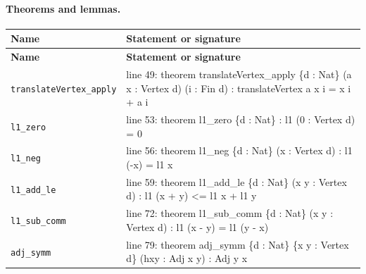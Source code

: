 \documentclass[10pt]{article}
\begin{document}
\paragraph{Theorems and lemmas.}
\begin{longtable}{>{\raggedright\arraybackslash}p{} >{\raggedright\arraybackslash}p{}}
\textbf{Name} & \textbf{Statement or signature} \\
\hline
\endfirsthead
\textbf{Name} & \textbf{Statement or signature} \\
\hline
\endhead
\texttt{translateVertex\_\allowbreak{}apply} & {\ttfamily\scriptsize line 49:\allowbreak{} theorem translateVertex\_\allowbreak{}apply \{d :\allowbreak{} Nat\} (\allowbreak{}a x :\allowbreak{} Vertex d)\allowbreak{} (\allowbreak{}i :\allowbreak{} Fin d)\allowbreak{} :\allowbreak{} translateVertex a x i =\allowbreak{} x i +\allowbreak{} a i} \\[0.45em]
\texttt{l1\_\allowbreak{}zero} & {\ttfamily\scriptsize line 53:\allowbreak{} theorem l1\_\allowbreak{}zero \{d :\allowbreak{} Nat\} :\allowbreak{} l1 (\allowbreak{}0 :\allowbreak{} Vertex d)\allowbreak{} =\allowbreak{} 0} \\[0.45em]
\texttt{l1\_\allowbreak{}neg} & {\ttfamily\scriptsize line 56:\allowbreak{} theorem l1\_\allowbreak{}neg \{d :\allowbreak{} Nat\} (\allowbreak{}x :\allowbreak{} Vertex d)\allowbreak{} :\allowbreak{} l1 (\allowbreak{}-\allowbreak{}x)\allowbreak{} =\allowbreak{} l1 x} \\[0.45em]
\texttt{l1\_\allowbreak{}add\_\allowbreak{}le} & {\ttfamily\scriptsize line 59:\allowbreak{} theorem l1\_\allowbreak{}add\_\allowbreak{}le \{d :\allowbreak{} Nat\} (\allowbreak{}x y :\allowbreak{} Vertex d)\allowbreak{} :\allowbreak{} l1 (\allowbreak{}x +\allowbreak{} y)\allowbreak{} <=\allowbreak{} l1 x +\allowbreak{} l1 y} \\[0.45em]
\texttt{l1\_\allowbreak{}sub\_\allowbreak{}comm} & {\ttfamily\scriptsize line 72:\allowbreak{} theorem l1\_\allowbreak{}sub\_\allowbreak{}comm \{d :\allowbreak{} Nat\} (\allowbreak{}x y :\allowbreak{} Vertex d)\allowbreak{} :\allowbreak{} l1 (\allowbreak{}x -\allowbreak{} y)\allowbreak{} =\allowbreak{} l1 (\allowbreak{}y -\allowbreak{} x)\allowbreak{}} \\[0.45em]
\texttt{adj\_\allowbreak{}symm} & {\ttfamily\scriptsize line 79:\allowbreak{} theorem adj\_\allowbreak{}symm \{d :\allowbreak{} Nat\} \{x y :\allowbreak{} Vertex d\} (\allowbreak{}hxy :\allowbreak{} Adj x y)\allowbreak{} :\allowbreak{} Adj y x} \\[0.45em]

\end{longtable}
\end{document}
